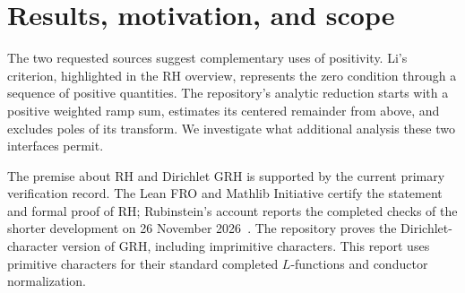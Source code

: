 \documentclass[11pt,a4paper]{article}
\theoremstyle{definition}
\theoremstyle{remark}
\numberwithin{equation}{section}
\begin{document}
\begin{abstract}
We develop two analytic results motivated by RH, Dirichlet GRH, and the
positive-sum interfaces in the Alp\"oge--Claude development. First,
replace every zero ordinate $\gamma$ by the angle
$2\arctan(1/(2\gamma))$ and use the symmetrized angles as jump sizes.
The standard zero-counting law produces a symmetric process with finite
variance and symbol
$\Psi(u)=\tfrac12|u|(\log|u|+\kappa_q)+O(\sqrt{|u|}\log|u|)$.
For $w=W_0(qe^{\gamma_E-1}/(\pi t))$ and $a=tw/2$, we prove an
explicit all-order expansion of $a f_t(ax)$ in powers of $1/w$, uniformly
on the real line and with any fixed number of derivatives. Its leading
term is the standard Cauchy density. The same profiles govern every
fixed primitive Dirichlet character; characters of equal conductor have
scaled densities differing by $O(\sqrt a)$. We obtain a circle
heat-trace expansion and compute the critical first-moment equivalent
$\mathbb E|X_t|\sim t\log^2(1/t)/(2\pi)$.

Second, we give bounded positive coefficients, supported at integer
indices, for which every fifth-power sample of a smoothed sum is exactly
zero while its Mellin transform has a pole at $3/5$. The construction
strengthens a known local interpolation obstruction into a global
example with an explicit analytic singularity. We separate these
results from established Li positivity, zero-counting asymptotics,
general small-time L\'evy theory, and existing fourth-power sampling
criteria.
\end{abstract}

\tableofcontents
\clearpage

\section{Results, motivation, and scope}

The two requested sources suggest complementary uses of positivity.
Li's criterion, highlighted in the RH overview, represents the zero
condition through a sequence of positive quantities. The repository's
analytic reduction starts with a positive weighted ramp sum, estimates
its centered remainder from above, and excludes poles of its transform.
We investigate what additional analysis these two interfaces permit.

The premise about RH and Dirichlet GRH is supported by the current
primary verification record. The Lean FRO and Mathlib Initiative
certify the statement and formal proof of RH; Rubinstein's account
reports the completed checks of the shorter development on 26 November
2026~\cite{LeanStatement,Rubinstein}. The repository proves the
Dirichlet-character version of GRH, including imprimitive characters.
This report uses primitive characters for their standard completed
$L$-functions and conductor normalization.
\end{document}
